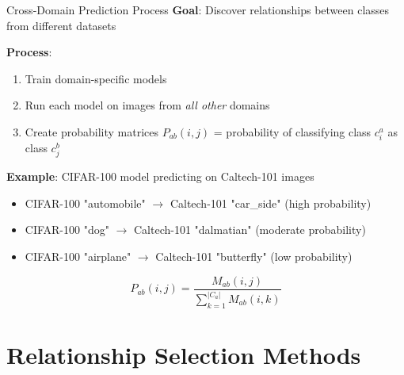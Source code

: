 \documentclass[aspectratio=169]{beamer}
\begin{document}
\begin{frame}{Cross-Domain Prediction Process}
    \textbf{Goal}: Discover relationships between classes from different datasets

    \vspace{0.5em}

    \textbf{Process}:
    \begin{enumerate}
        \item Train domain-specific models
        \item Run each model on images from \emph{all other} domains
        \item Create probability matrices $P_{ab}(i,j)$ = probability of classifying class $c_i^a$ as class $c_j^b$
    \end{enumerate}

    \vspace{0.5em}

    \textbf{Example}: CIFAR-100 model predicting on Caltech-101 images
    \begin{itemize}
        \item CIFAR-100 "automobile" $\rightarrow$ Caltech-101 "car\_side" (high probability)
        \item CIFAR-100 "dog" $\rightarrow$ Caltech-101 "dalmatian" (moderate probability)
        \item CIFAR-100 "airplane" $\rightarrow$ Caltech-101 "butterfly" (low probability)
    \end{itemize}

    \vspace{0.5em}

    \begin{equation}
        P_{ab}(i, j) = \frac{M_{ab}(i, j)}{\sum_{k=1}^{|C_a|} M_{ab}(i, k)}
    \end{equation}
\end{frame}

\section{Relationship Selection Methods}
\end{document}
